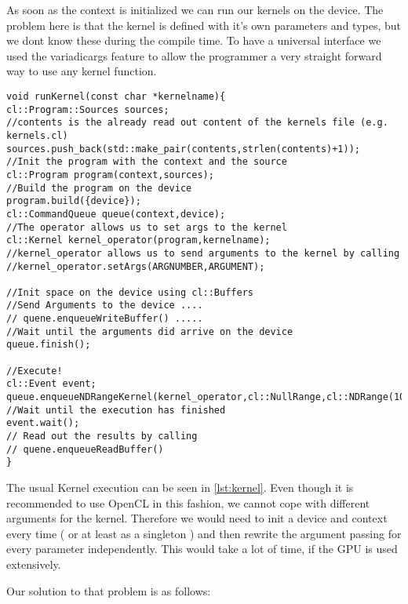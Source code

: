 \documentclass{acm_proc_article-sp}
\begin{document}
As soon as the context is initialized we can run our kernels on the device. The problem here is that the kernel is defined with it's own parameters and types, but we dont know these during the compile time.
To have a universal interface we used the variadicargs feature to allow the programmer a very straight forward way to use any kernel function.
\label{lst:kernel}
\begin{lstlisting}[caption=Kernel usage]
void runKernel(const char *kernelname){
cl::Program::Sources sources;
//contents is the already read out content of the kernels file (e.g. kernels.cl)
sources.push_back(std::make_pair(contents,strlen(contents)+1));
//Init the program with the context and the source
cl::Program program(context,sources);
//Build the program on the device
program.build({device});
cl::CommandQueue queue(context,device);
//The operator allows us to set args to the kernel
cl::Kernel kernel_operator(program,kernelname);
//kernel_operator allows us to send arguments to the kernel by calling
//kernel_operator.setArgs(ARGNUMBER,ARGUMENT);

//Init space on the device using cl::Buffers
//Send Arguments to the device ....
// quene.enqueueWriteBuffer() .....
//Wait until the arguments did arrive on the device
queue.finish();

//Execute!
cl::Event event;
queue.enqueueNDRangeKernel(kernel_operator,cl::NullRange,cl::NDRange(10),cl::NullRange,NULL,&event);
//Wait until the execution has finished
event.wait();
// Read out the results by calling
// quene.enqueueReadBuffer()
}
\end{lstlisting}

The usual Kernel execution can be seen in \ref{lst:kernel}. Even though it is recommended to use OpenCL in this fashion, we cannot cope with different arguments for the kernel. Therefore we would need to init a device and context every time ( or at least as a singleton ) and then rewrite the argument passing for every parameter independently. This would take a lot of time, if the GPU is used extensively.

Our solution to that problem is as follows:
\end{document}
